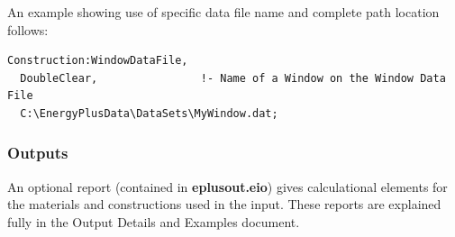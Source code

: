 An example showing use of specific data file name and complete path location follows:

\begin{lstlisting}
Construction:WindowDataFile,
  DoubleClear,                !- Name of a Window on the Window Data File
  C:\EnergyPlusData\DataSets\MyWindow.dat;
\end{lstlisting}

\subsubsection{Outputs}\label{outputs-4-016}

An optional report (contained in \textbf{eplusout.eio}) gives calculational elements for the materials and constructions used in the input. These reports are explained fully in the Output Details and Examples document.
